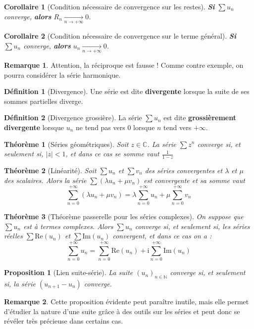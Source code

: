 \documentclass[french]{book}
\newcommand{\N}{\mathbb{N}}
\newcommand{\C}{\mathbb{C}}
\theoremstyle{plain}
\newtheorem{thm}{Théorème}[chapter]
\newtheorem{prop}{Proposition}[chapter]
\newtheorem{cor}{Corollaire}[chapter]
\theoremstyle{definition}
\newtheorem{dfn}{Définition}[chapter]
\newtheorem{rmq}{Remarque}[chapter]
\theoremstyle{remark}
\begin{document}
\begin{cor}[Condition nécessaire de convergence sur les restes]
	\textbf{Si} $\displaystyle \sum u_n$ converge, \textbf{alors} $\displaystyle R_n \xrightarrow[n\to+\infty]{}0$.
\end{cor}
\begin{cor}[Condition nécessaire de convergence sur le terme général]
	\textbf{Si} $\displaystyle \sum u_n$ converge, \textbf{alors} $\displaystyle u_n \xrightarrow[n\to+\infty]{}0$.
\end{cor}
\begin{rmq} Attention, la réciproque est fausse ! Comme contre exemple, on pourra considérer la série harmonique. \end{rmq}
\begin{dfn}[Divergence]
	Une série est dite \textbf{divergente} lorsque la suite de ses sommes partielles diverge.
\end{dfn}
\begin{dfn}[Divergence grossière]
	La série $\displaystyle \sum u_n$ est dite \textbf{grossièrement divergente} lorsque $u_n$ ne tend pas vers $0$ lorsque $n$ tend vers $+\infty$.
\end{dfn}
\begin{thm}[Séries géométriques]
	Soit $z\in\C$. La série $\displaystyle \sum z^n$ converge si, et seulement si, $\lvert z\rvert<1$, et dans ce cas se somme vaut $\displaystyle \frac{1}{1-z}$
\end{thm}
\begin{thm}[Linéarité]
	Soit $\displaystyle \sum u_n$ et $\displaystyle \sum v_n$ des séries convergentes et $\lambda$ et $\mu$ des scalaires. Alors la série $\displaystyle \sum (\lambda u_n+\mu v_n)$ est convergente et sa somme vaut $$\sum_{n=0}^{+\infty}(\lambda u_n +\mu v_n)=\lambda \sum_{n=0}^{+\infty}u_n+\mu\sum_{n=0}^{+\infty}v_n$$
\end{thm}
\begin{thm}[Théorème passerelle pour les séries complexes]
	On suppose que $\displaystyle \sum u_n$ est à termes complexes. Alors $\displaystyle \sum u_n$ converge si, et seulement si, les séries réelles $\displaystyle \sum \text{Re}(u_n)$ et $\displaystyle \sum \text{Im}(u_n)$ convergent, et dans ce cas on a : $$\sum_{n=0}^{+\infty}u_n= \sum_{n=0}^{+\infty}\text{Re}(u_n)+\text{i}\sum_{n=0}^{+\infty}\text{Im}(u_n)$$
\end{thm}
\begin{prop}[Lien suite-série]
	La suite $(u_n)_{n\in\N}$ converge si, et seulement si, la série $\displaystyle(u_{n+1}-u_n)$ converge.
\end{prop}
\begin{rmq} Cette proposition évidente peut paraître inutile, mais elle permet d'étudier la nature d'une suite grâce à des outils sur les séries et peut donc se révéler très précieuse dans certains cas. \end{rmq}
\end{document}
